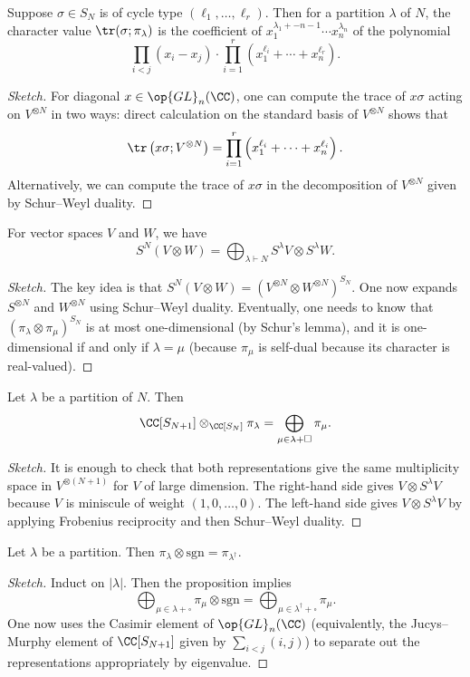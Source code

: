 \documentclass{article}
\begin{document}
\begin{theorem}
	Suppose $\sigma\in S_N$ is of cycle type $(\ell_1,\ldots,\ell_r)$. Then for a partition $\lambda$ of $N$, the character value $\tr(\sigma;\pi_\lambda)$ is the coefficient of $x_1^{\lambda_1+-n-1}\cdots x_n^{\lambda_n}$ of the polynomial
	\[\prod_{i<j}(x_i-x_j)\cdot\prod_{i=1}^r\left(x_1^{\ell_i}+\cdots+x_n^{\ell_r}\right).\]
\end{theorem}
\begin{proof}[Sketch]
	For diagonal $x\in\op{GL}_n(\CC)$, one can compute the trace of $x\sigma$ acting on $V^{\otimes N}$ in two ways: direct calculation on the standard basis of $V^{\otimes N}$ shows that
	\[\tr\left(x\sigma;V^{\otimes N}\right)=\prod_{i=1}^r\left(x_1^{\ell_i}+\cdots+x_n^{\ell_i}\right).\]
	Alternatively, we can compute the trace of $x\sigma$ in the decomposition of $V^{\otimes N}$ given by Schur--Weyl duality.
\end{proof}
\begin{theorem}
	For vector spaces $V$ and $W$, we have
	\[S^N(V\otimes W)=\bigoplus_{\lambda\vdash N}S^\lambda V\otimes S^\lambda W.\]
\end{theorem}
\begin{proof}[Sketch]
	The key idea is that $S^N(V\otimes W)=\left(V^{\otimes N}\otimes W^{\otimes N}\right)^{S_N}$. One now expands $S^{\otimes N}$ and $W^{\otimes N}$ using Schur--Weyl duality. Eventually, one needs to know that $(\pi_\lambda\otimes\pi_\mu)^{S_N}$ is at most one-dimensional (by Schur's lemma), and it is one-dimensional if and only if $\lambda=\mu$ (because $\pi_\mu$ is self-dual because its character is real-valued).
\end{proof}
\begin{proposition}
	Let $\lambda$ be a partition of $N$. Then
	\[\CC[S_{N+1}]\otimes_{\CC[S_N]}\pi_\lambda=\bigoplus_{\mu\in\lambda+\square}\pi_\mu.\]
\end{proposition}
\begin{proof}[Sketch]
	It is enough to check that both representations give the same multiplicity space in $V^{\otimes(N+1)}$ for $V$ of large dimension. The right-hand side gives $V\otimes S^\lambda V$ because $V$ is miniscule of weight $(1,0,\ldots,0)$. The left-hand side gives $V\otimes S^\lambda V$ by applying Frobenius reciprocity and then Schur--Weyl duality.
\end{proof}
\begin{corollary}
	Let $\lambda$ be a partition. Then $\pi_\lambda\otimes\mathrm{sgn}=\pi_{\lambda^\dagger}$.
\end{corollary}
\begin{proof}[Sketch]
	Induct on $\left|\lambda\right|$. Then the proposition implies
	\[\bigoplus_{\mu\in\lambda+\square}\pi_\mu\otimes\mathrm{sgn}=\bigoplus_{\mu\in\lambda^\dagger+\square}\pi_\mu.\]
	One now uses the Casimir element of $\op{GL}_n(\CC)$ (equivalently, the Jucys--Murphy element of $\CC[S_{N+1}]$ given by $\sum_{i<j}(i,j)$) to separate out the representations appropriately by eigenvalue.
\end{proof}
\end{document}
